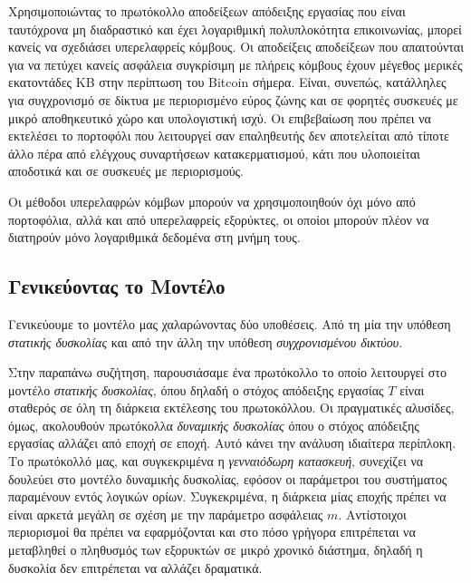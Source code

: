 
Χρησιμοποιώντας το πρωτόκολλο αποδείξεων απόδειξης εργασίας που είναι ταυτόχρονα
μη διαδραστικό και έχει λογαριθμική πολυπλοκότητα επικοινωνίας, μπορεί κανείς να
σχεδιάσει υπερελαφρείς κόμβους. Οι αποδείξεις αποδείξεων
που απαιτούνται για να πετύχει κανείς ασφάλεια συγκρίσιμη με πλήρεις κόμβους έχουν
μέγεθος μερικές εκατοντάδες KB στην περίπτωση του Bitcoin σήμερα. Είναι,
συνεπώς, κατάλληλες για συγχρονισμό σε δίκτυα με περιορισμένο εύρος ζώνης και
σε φορητές συσκευές με μικρό αποθηκευτικό χώρο και υπολογιστική ισχύ. Οι επιβεβαίωση
που πρέπει να εκτελέσει το πορτοφόλι που λειτουργεί σαν επαληθευτής δεν αποτελείται από τίποτε
άλλο πέρα από ελέγχους συναρτήσεων κατακερματισμού, κάτι που υλοποιείται αποδοτικά
και σε συσκευές με περιορισμούς.

Οι μέθοδοι υπερελαφρών κόμβων μπορούν να χρησιμοποιηθούν όχι μόνο από πορτοφόλια,
αλλά και από υπερελαφρείς εξορύκτες, οι οποίοι μπορούν πλέον να διατηρούν μόνο λογαριθμικά
δεδομένα στη μνήμη τους.

\subsection*{Γενικεύοντας το Μοντέλο}
Γενικεύουμε το μοντέλο μας χαλαρώνοντας δύο υποθέσεις. Από τη μία την υπόθεση \emph{στατικής
δυσκολίας} και από την άλλη την υπόθεση \emph{συγχρονισμένου δικτύου}.

Στην παραπάνω συζήτηση, παρουσιάσαμε ένα πρωτόκολλο το οποίο λειτουργεί στο μοντέλο
\emph{στατικής δυσκολίας}, όπου δηλαδή ο στόχος απόδειξης εργασίας $T$ είναι σταθερός
σε όλη τη διάρκεια εκτέλεσης του πρωτοκόλλου. Οι πραγματικές αλυσίδες, όμως, ακολουθούν
πρωτόκολλα \emph{δυναμικής δυσκολίας} όπου ο στόχος απόδειξης εργασίας αλλάζει από εποχή
σε εποχή. Αυτό κάνει την ανάλυση ιδιαίτερα περίπλοκη. Το πρωτόκολλό μας, και συγκεκριμένα
η \emph{γενναιόδωρη κατασκευή}, συνεχίζει να δουλεύει στο μοντέλο δυναμικής δυσκολίας,
εφόσον οι παράμετροι του συστήματος παραμένουν εντός λογικών ορίων.
Συγκεκριμένα, η
διάρκεια μίας εποχής πρέπει να είναι αρκετά μεγάλη σε σχέση με την παράμετρο ασφάλειας
$m$.
Αντίστοιχοι περιορισμοί θα πρέπει να εφαρμόζονται και στο πόσο γρήγορα επιτρέπεται να
μεταβληθεί ο πληθυσμός των εξορυκτών σε μικρό χρονικό διάστημα, δηλαδή η δυσκολία δεν
επιτρέπεται να αλλάζει δραματικά.

